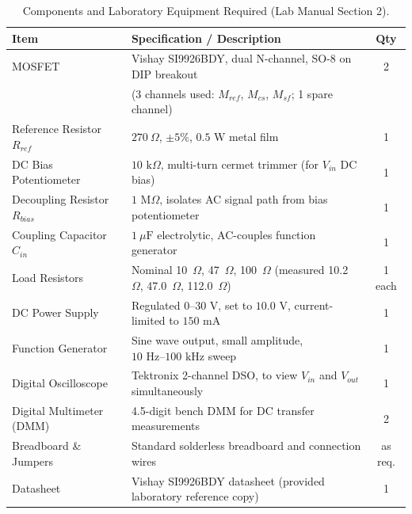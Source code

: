 \documentclass[11pt, a4paper]{article}
\begin{document}
\begin{table}[H]
    \centering
    \small
    \begin{tabular}{lp{8.5cm}c}
        \toprule
        \textbf{Item} & \textbf{Specification / Description} & \textbf{Qty} \\
        \midrule
        MOSFET & Vishay SI9926BDY, dual N-channel, SO-8 on DIP breakout & 2 \\
               & (3 channels used: $M_{ref}$, $M_{cs}$, $M_{sf}$; 1 spare channel) & \\
        Reference Resistor $R_{ref}$ & $270\ \Omega$, $\pm 5\%$, $0.5\text{ W}$ metal film & 1 \\
        DC Bias Potentiometer & $10\text{ k}\Omega$, multi-turn cermet trimmer (for $V_{in}$ DC bias) & 1 \\
        Decoupling Resistor $R_{bias}$ & $1\text{ M}\Omega$, isolates AC signal path from bias potentiometer & 1 \\
        Coupling Capacitor $C_{in}$ & $1\ \mu\text{F}$ electrolytic, AC-couples function generator & 1 \\
        Load Resistors & Nominal 10~$\Omega$, 47~$\Omega$, 100~$\Omega$ (measured 10.2~$\Omega$, 47.0~$\Omega$, 112.0~$\Omega$) & 1 each \\
        DC Power Supply & Regulated $0\text{--}30\text{ V}$, set to $10.0\text{ V}$, current-limited to $150\text{ mA}$ & 1 \\
        Function Generator & Sine wave output, small amplitude, $10\text{ Hz}\text{--}100\text{ kHz}$ sweep & 1 \\
        Digital Oscilloscope & Tektronix 2-channel DSO, to view $V_{in}$ and $V_{out}$ simultaneously & 1 \\
        Digital Multimeter (DMM) & 4.5-digit bench DMM for DC transfer measurements & 2 \\
        Breadboard \& Jumpers & Standard solderless breadboard and connection wires & as req. \\
        Datasheet & Vishay SI9926BDY datasheet (provided laboratory reference copy) & 1 \\
        \bottomrule
    \end{tabular}
    \caption{Components and Laboratory Equipment Required (Lab Manual Section 2).}
    \label{tab:components}
\end{table}
\end{document}
